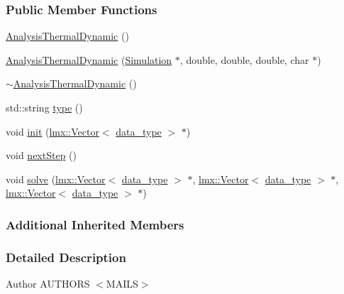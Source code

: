 \subsubsection*{Public Member Functions}
\begin{DoxyCompactItemize}
\item 
\hyperlink{classmknix_1_1_analysis_thermal_dynamic_a475e28b3bb7b7a9d2cf3628863bd8291}{Analysis\+Thermal\+Dynamic} ()
\item 
\hyperlink{classmknix_1_1_analysis_thermal_dynamic_a161ebe1ed696232ed05ef778cdcabcb8}{Analysis\+Thermal\+Dynamic} (\hyperlink{classmknix_1_1_simulation}{Simulation} $\ast$, double, double, double, char $\ast$)
\item 
\hyperlink{classmknix_1_1_analysis_thermal_dynamic_ad0dbaa6affc6e4a285d310e209fe2b73}{$\sim$\+Analysis\+Thermal\+Dynamic} ()
\item 
std\+::string \hyperlink{classmknix_1_1_analysis_thermal_dynamic_ae1d271bfca189706a101259cff192ec9}{type} ()
\item 
void \hyperlink{classmknix_1_1_analysis_thermal_dynamic_a616aac65d4489996979a0c9120089e37}{init} (\hyperlink{classlmx_1_1_vector}{lmx\+::\+Vector}$<$ \hyperlink{namespacemknix_a16be4b246fbf2cceb141e3a179111020}{data\+\_\+type} $>$ $\ast$)
\item 
void \hyperlink{classmknix_1_1_analysis_thermal_dynamic_a2c5b1abfa4cfbfea523e27286146fe77}{next\+Step} ()
\item 
void \hyperlink{classmknix_1_1_analysis_thermal_dynamic_a17a9d48a88a1268960dc15371ab703a7}{solve} (\hyperlink{classlmx_1_1_vector}{lmx\+::\+Vector}$<$ \hyperlink{namespacemknix_a16be4b246fbf2cceb141e3a179111020}{data\+\_\+type} $>$ $\ast$, \hyperlink{classlmx_1_1_vector}{lmx\+::\+Vector}$<$ \hyperlink{namespacemknix_a16be4b246fbf2cceb141e3a179111020}{data\+\_\+type} $>$ $\ast$, \hyperlink{classlmx_1_1_vector}{lmx\+::\+Vector}$<$ \hyperlink{namespacemknix_a16be4b246fbf2cceb141e3a179111020}{data\+\_\+type} $>$ $\ast$)
\end{DoxyCompactItemize}
\subsubsection*{Additional Inherited Members}


\subsubsection{Detailed Description}
\begin{DoxyAuthor}{Author}
A\+U\+T\+H\+O\+R\+S $<$\+M\+A\+I\+L\+S$>$ 
\end{DoxyAuthor}


